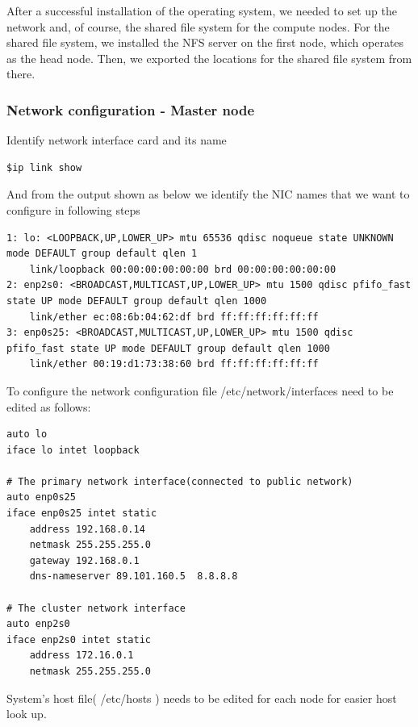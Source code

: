 After a successful installation of the operating system, we needed to set up the network and, of course, the shared file system for the compute nodes. For the shared file system, we installed the NFS server on the first node, which operates as the head node. Then, we exported the locations for the shared file system from there.

\subsubsection{Network configuration - Master node}

Identify network interface card and its name
\begin{lstlisting}[style=BashInputStyle]
$ip link show
\end{lstlisting}

And from the output shown as below we identify the NIC names that we want to configure in following steps

\begin{lstlisting}[style=BashInputStyle]
1: lo: <LOOPBACK,UP,LOWER_UP> mtu 65536 qdisc noqueue state UNKNOWN mode DEFAULT group default qlen 1
    link/loopback 00:00:00:00:00:00 brd 00:00:00:00:00:00
2: enp2s0: <BROADCAST,MULTICAST,UP,LOWER_UP> mtu 1500 qdisc pfifo_fast state UP mode DEFAULT group default qlen 1000
    link/ether ec:08:6b:04:62:df brd ff:ff:ff:ff:ff:ff
3: enp0s25: <BROADCAST,MULTICAST,UP,LOWER_UP> mtu 1500 qdisc pfifo_fast state UP mode DEFAULT group default qlen 1000
    link/ether 00:19:d1:73:38:60 brd ff:ff:ff:ff:ff:ff
\end{lstlisting}

To configure the network configuration file /etc/network/interfaces need to be edited as follows:
\begin{lstlisting}[style=BashInputStyle]
auto lo
iface lo intet loopback

# The primary network interface(connected to public network)
auto enp0s25
iface enp0s25 intet static
	address 192.168.0.14
	netmask 255.255.255.0
	gateway 192.168.0.1
	dns-nameserver 89.101.160.5  8.8.8.8

# The cluster network interface
auto enp2s0
iface enp2s0 intet static
	address 172.16.0.1
	netmask 255.255.255.0
\end{lstlisting}

System's host file( /etc/hosts ) needs to be edited for each node for easier host look up.

